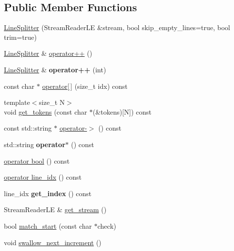 \subsection*{Public Member Functions}
\begin{DoxyCompactItemize}
\item 
\hyperlink{class_assimp_1_1_line_splitter_a72441b81e4b31974c093fdd2e893b067}{Line\+Splitter} (Stream\+Reader\+L\+E \&stream, bool skip\+\_\+empty\+\_\+lines=true, bool trim=true)
\item 
\hyperlink{class_assimp_1_1_line_splitter}{Line\+Splitter} \& \hyperlink{class_assimp_1_1_line_splitter_a94dadcb75b14ea8d1293fd642dbb683e}{operator++} ()
\item 
\hypertarget{class_assimp_1_1_line_splitter_a0fc7bba8ce93a9ea71e934ac2a10566a}{\hyperlink{class_assimp_1_1_line_splitter}{Line\+Splitter} \& {\bfseries operator++} (int)}\label{class_assimp_1_1_line_splitter_a0fc7bba8ce93a9ea71e934ac2a10566a}

\item 
const char $\ast$ \hyperlink{class_assimp_1_1_line_splitter_a5cfd97937d8f47a6c1d826fd8c2e38c3}{operator\mbox{[}$\,$\mbox{]}} (size\+\_\+t idx) const 
\item 
{\footnotesize template$<$size\+\_\+t N$>$ }\\void \hyperlink{class_assimp_1_1_line_splitter_ad50d7cb962ba65061c1e4cb7bc2c3b64}{get\+\_\+tokens} (const char $\ast$(\&tokens)\mbox{[}N\mbox{]}) const 
\item 
const std\+::string $\ast$ \hyperlink{class_assimp_1_1_line_splitter_ad1fbcf3c240f1c87981088165d6f44d4}{operator-\/$>$} () const 
\item 
\hypertarget{class_assimp_1_1_line_splitter_a8bef76634cb214923a872b423534db34}{std\+::string {\bfseries operator$\ast$} () const }\label{class_assimp_1_1_line_splitter_a8bef76634cb214923a872b423534db34}

\item 
\hyperlink{class_assimp_1_1_line_splitter_ac837755efd077aed8169a3ff96d09462}{operator bool} () const 
\item 
\hyperlink{class_assimp_1_1_line_splitter_ad0a13e30b2bd2d33e584fbfb86188564}{operator line\+\_\+idx} () const 
\item 
\hypertarget{class_assimp_1_1_line_splitter_a6843838ee9eb217cf615c601c905183e}{line\+\_\+idx {\bfseries get\+\_\+index} () const }\label{class_assimp_1_1_line_splitter_a6843838ee9eb217cf615c601c905183e}

\item 
Stream\+Reader\+L\+E \& \hyperlink{class_assimp_1_1_line_splitter_a3a954b7c05c05c942a29ae41851cf535}{get\+\_\+stream} ()
\item 
bool \hyperlink{class_assimp_1_1_line_splitter_ad63e70a9e0991a1e5df59a333e088b8d}{match\+\_\+start} (const char $\ast$check)
\item 
void \hyperlink{class_assimp_1_1_line_splitter_ae5987477ec7ea8c4b4d58615df0a3ad1}{swallow\+\_\+next\+\_\+increment} ()
\end{DoxyCompactItemize}


